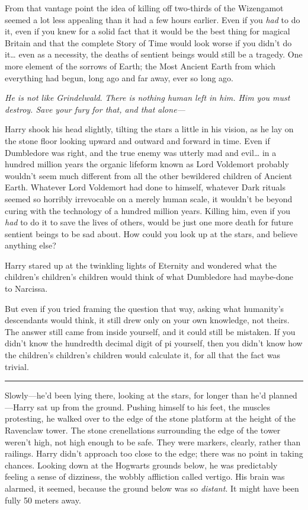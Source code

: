 From that vantage point the idea of killing off two-thirds of the
Wizengamot seemed a lot less appealing than it had a few hours earlier.
Even if you \emph{had} to do it, even if you knew for a solid fact that
it would be the best thing for magical Britain and that the complete
Story of Time would look worse if you didn't do it\ldots{} even as a
necessity, the deaths of sentient beings would still be a tragedy. One
more element of the sorrows of Earth; the Most Ancient Earth from which
everything had begun, long ago and far away, ever so long ago.

\emph{He is not like Grindelwald}. \emph{There is nothing human left in
him. Him you must destroy. Save your fury for that, and that alone---}

Harry shook his head slightly, tilting the stars a little in his vision,
as he lay on the stone floor looking upward and outward and forward in
time. Even if Dumbledore was right, and the true enemy was utterly mad
and evil\ldots{} in a hundred million years the organic lifeform known
as Lord Voldemort probably wouldn't seem much different from all the
other bewildered children of Ancient Earth. Whatever Lord Voldemort had
done to himself, whatever Dark rituals seemed so horribly irrevocable on
a merely human scale, it wouldn't be beyond curing with the technology
of a hundred million years. Killing him, even if you \emph{had} to do it
to save the lives of others, would be just one more death for future
sentient beings to be sad about. How could you look up at the stars, and
believe anything else?

Harry stared up at the twinkling lights of Eternity and wondered what
the children's children's children would think of what Dumbledore had
maybe-done to Narcissa.

But even if you tried framing the question that way, asking what
humanity's descendants would think, it still drew only on your own
knowledge, not theirs. The answer still came from inside yourself, and
it could still be mistaken. If you didn't know the hundredth decimal
digit of pi yourself, then you didn't know how the children's children's
children would calculate it, for all that the fact was trivial.

\begin{center}\rule{3in}{0.4pt}\end{center}

Slowly---he'd been lying there, looking at the stars, for longer than
he'd planned---Harry sat up from the ground. Pushing himself to his
feet, the muscles protesting, he walked over to the edge of the stone
platform at the height of the Ravenclaw tower. The stone crenellations
surrounding the edge of the tower weren't high, not high enough to be
safe. They were markers, clearly, rather than railings. Harry didn't
approach too close to the edge; there was no point in taking chances.
Looking down at the Hogwarts grounds below, he was predictably feeling a
sense of dizziness, the wobbly affliction called vertigo. His brain was
alarmed, it seemed, because the ground below was so \emph{distant}. It
might have been fully 50 meters away.

